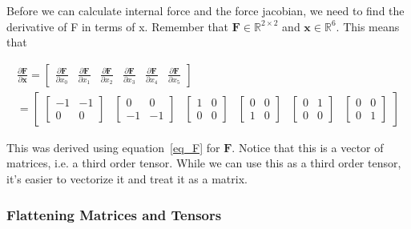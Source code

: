 \documentclass[twocolumn,10pt]{asme2ej}
\begin{document}
Before we can calculate internal force and the force jacobian, we need to find the derivative of F in terms of x. Remember that $\bm{F} \in \mathbb{R}^{2 \times 2}$ and $\bm{x} \in \mathbb{R}^6$. This means that

\begin{equation}
  \begin{split}
    \frac{\partial \bm{F}}{\partial \bm{x}} = \begin{bmatrix} \frac{\partial \bm{F}}{\partial x_0} & \frac{\partial \bm{F}}{\partial x_1}
    & \frac{\partial \bm{F}}{\partial x_2} & \frac{\partial \bm{F}}{\partial x_3} & \frac{\partial \bm{F}}{\partial x_4}
    & \frac{\partial \bm{F}}{\partial x_5} \end{bmatrix} \\
    = \begin{bmatrix} \begin{bmatrix} -1 & -1 \\ 0 & 0 \end{bmatrix} & \begin{bmatrix} 0 & 0 \\ -1 & -1 \end{bmatrix}
  & \begin{bmatrix} 1 & 0 \\ 0 & 0 \end{bmatrix} & \begin{bmatrix} 0 & 0 \\ 1 & 0 \end{bmatrix}
  & \begin{bmatrix} 0 & 1 \\ 0 & 0 \end{bmatrix} & \begin{bmatrix} 0 & 0 \\ 0 & 1 \end{bmatrix}\end{bmatrix}
  \end{split}
\label{eq_dFdx}
\end{equation}

This was derived using equation~\ref{eq_F} for $\bm{F}$. Notice that this is a vector of matrices, i.e. a third order tensor. While we can use this as a third order tensor, it's easier to vectorize it and treat it as a matrix.

\subsubsection{Flattening Matrices and Tensors}
\end{document}
